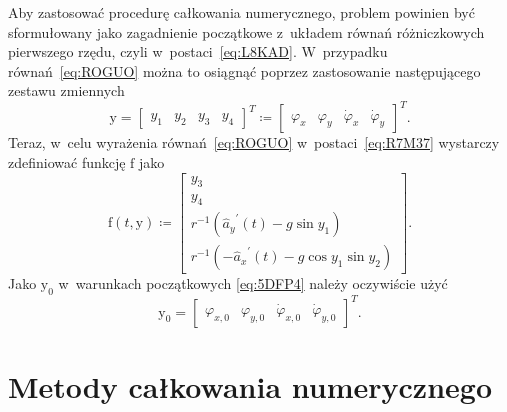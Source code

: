 \documentclass[paper=a4,DIV=12]{lpas}
\newcommand{\brm}[1]{\bm{\mathrm{#1}}}
\begin{document}
\begin{appendices}
Aby zastosować procedurę całkowania numerycznego, problem powinien być
sformułowany jako zagadnienie początkowe z~układem równań różniczkowych
pierwszego rzędu, czyli w~postaci~\eqref{eq:L8KAD}. W~przypadku
równań~\eqref{eq:ROGUO} można to osiągnąć poprzez zastosowanie następującego
zestawu zmiennych
\begin{equation}
  \brm{y} = \begin{bmatrix}
    y_1 & y_2 & y_3 & y_4
  \end{bmatrix}^T \coloneqq \begin{bmatrix}
    \varphi_x & \varphi_y & \dot{\varphi}_x & \dot{\varphi}_y
  \end{bmatrix}^T.
  \label{eq:U09S6}
\end{equation}
Teraz, w~celu wyrażenia równań~\eqref{eq:ROGUO} w~postaci~\eqref{eq:R7M37}
wystarczy zdefiniować funkcję $\brm{f}$ jako
\begin{equation}
  \brm{f}\left(t,\brm{y}\right) \coloneqq \begin{bmatrix}
    y_3 \\
    y_4 \\
    r^{-1} \left( {\hat{a}_y}^{\prime}\left(t\right) - g \sin{y_1} \right)  \\
    r^{-1} \left(-{\hat{a}_x}^{\prime}\left(t\right) - g \cos{y_1}\sin{y_2} \right)
  \end{bmatrix}.
  \label{eq:S8LTL}
\end{equation}
Jako $\brm{y}_0$ w~warunkach początkowych \eqref{eq:5DFP4} należy oczywiście
użyć
\begin{equation}
  \brm{y}_0 = \begin{bmatrix}
    \varphi_{x,0} & \varphi_{y,0} & \dot{\varphi}_{x,0} & \dot{\varphi}_{y,0}
  \end{bmatrix}^T.
\end{equation}

\section{Metody całkowania numerycznego}
\label{sec:VNLHT}


\end{appendices}
\end{document}
